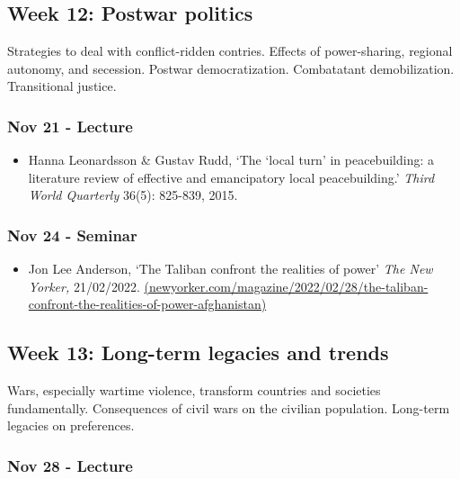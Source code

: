 \documentclass[12pt, a4paper]{article}
\begin{document}
\subsection*{Week 12: Postwar politics}

Strategies to deal with conflict-ridden contries. Effects of power-sharing, regional autonomy, and secession. Postwar democratization. Combatatant demobilization. Transitional justice.

\subsubsection*{Nov 21 - Lecture}

\begin{itemize}
\setlength\itemsep{0pt}
\item Hanna Leonardsson \& Gustav Rudd, `The ‘local turn’ in peacebuilding: a literature review of effective and emancipatory local peacebuilding.' \textit{Third World Quarterly} 36(5): 825-839, 2015.
\end{itemize}

\subsubsection*{Nov 24 - Seminar}

\begin{itemize}
\setlength\itemsep{0pt}
\item Jon Lee Anderson, `The Taliban confront the realities of power' \textit{The New Yorker,} 21/02/2022. \href{https://www.newyorker.com/magazine/2022/02/28/the-taliban-confront-the-realities-of-power-afghanistan}{(newyorker.com/magazine/2022/02/28/the-taliban-confront-the-realities-of-power-afghanistan)}
\end{itemize}


\hline %

\subsection*{Week 13: Long-term legacies and trends}

Wars, especially wartime violence, transform countries and societies fundamentally. Consequences of civil wars on the civilian population. Long-term legacies on preferences.

\subsubsection*{Nov 28 - Lecture}
\end{document}
